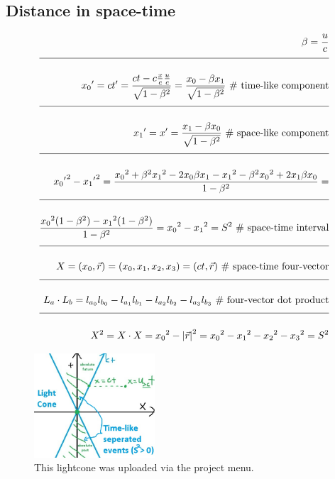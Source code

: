 \documentclass[a4paper]{article}
\newcommand{\eqComment}[1]{\text{  \# #1}}
\newcommand{\n}{\\[1.5ex] \hline \nonumber \\[0ex]}
\begin{document}
\subsection{Distance in space-time}
\begin{tcolorbox}
\begin{align}
   \beta = \frac{u}{c}
\n {x_0}^\prime = c t^\prime = \frac{c t - c \frac{x}{c} \frac{u}{c}}{\sqrt{1 - \beta^2}} = \frac{x_0 - \beta x_1}{\sqrt{1 - \beta^2}} \eqComment{time-like component}
\n {x_1}^\prime = x^\prime = \frac{x_1 - \beta x_0}{\sqrt{1 - \beta^2}} \eqComment{space-like component}
\n {{x_0}^\prime}^2 - {{x_1}^\prime}^2 = \frac{{x_0}^2 + \beta^2 {x_1}^2 - 2 x_0 \beta x_1 - {x_1}^2 - \beta^2 {x_0}^2 + 2 x_1 \beta x_0}{1 - \beta^2} =
\n \frac{{x_0}^2 (1 - \beta^2) - {x_1}^2 (1 - \beta^2)}{1 - \beta^2} = {x_0}^2 - {x_1}^2 = S^2 \eqComment{space-time interval}
\n X = (x_0, \vec{r}) = (x_0, x_1 ,x_2, x_3) = (c t, \vec{r}) \eqComment{space-time four-vector}
\n L_a \cdot L_b = l_{a_0} l_{b_0} - l_{a_1} l_{b_1} - l_{a_2} l_{b_2} - l_{a_3} l_{b_3} \eqComment{four-vector dot product}
\n X^2 = X \cdot X = {x_0}^2 - {|\vec{r}|}^2 = {x_0}^2 - {x_1}^2 - {x_2}^2 - {x_3}^2 = S^2
\end{align}
\end{tcolorbox}

\begin{figure}[h]
\centering
\includegraphics[width=0.40\textwidth]{figures/lightcone.jpg}
\caption{\label{fig:lightcone}This lightcone was uploaded via the project menu.}
\end{figure} \FloatBarrier
\end{document}
